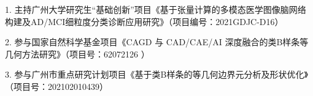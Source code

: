 \begin{projects}{99}
\ifphd
{}
\else
{}
\fi

\item[1.]
主持广州大学研究生“基础创新”项目《基于张量计算的多模态医学图像脑网络构建及AD/MCI细粒度分类诊断应用研究》（项目编号：2021GDJC-D16）

\item[2.]
参与国家自然科学基金项目《CAGD 与 CAD/CAE/AI 深度融合的类B样条等几何方法研究》（项目号：62072126 ）

\item[3.]
参与广州市重点研究计划项目《基于类B样条的等几何边界元分析及形状优化》（项目号：202102010439）

\end{projects}
